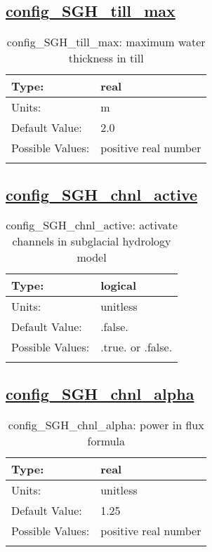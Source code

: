 \subsection[config\_SGH\_till\_max]{\hyperref[sec:nm_tab_subglacial_hydro]{config\_SGH\_till\_max}}
\label{subsec:nm_sec_config_SGH_till_max}
\begin{center}
\begin{longtable}{| p{2.0in} || p{4.0in} |}
    \hline
    Type: & real \\
    \hline
    Units: & \si{m} \\
    \hline
    Default Value: & 2.0 \\
    \hline
    Possible Values: & positive real number \\
    \hline
    \caption{config\_SGH\_till\_max: maximum water thickness in till}
\end{longtable}
\end{center}
\subsection[config\_SGH\_chnl\_active]{\hyperref[sec:nm_tab_subglacial_hydro]{config\_SGH\_chnl\_active}}
\label{subsec:nm_sec_config_SGH_chnl_active}
\begin{center}
\begin{longtable}{| p{2.0in} || p{4.0in} |}
    \hline
    Type: & logical \\
    \hline
    Units: & \si{unitless} \\
    \hline
    Default Value: & .false. \\
    \hline
    Possible Values: & .true. or .false. \\
    \hline
    \caption{config\_SGH\_chnl\_active: activate channels in subglacial hydrology model}
\end{longtable}
\end{center}
\subsection[config\_SGH\_chnl\_alpha]{\hyperref[sec:nm_tab_subglacial_hydro]{config\_SGH\_chnl\_alpha}}
\label{subsec:nm_sec_config_SGH_chnl_alpha}
\begin{center}
\begin{longtable}{| p{2.0in} || p{4.0in} |}
    \hline
    Type: & real \\
    \hline
    Units: & \si{unitless} \\
    \hline
    Default Value: & 1.25 \\
    \hline
    Possible Values: & positive real number \\
    \hline
    \caption{config\_SGH\_chnl\_alpha: power in flux formula}
\end{longtable}
\end{center}
